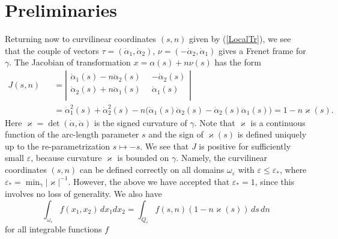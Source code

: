 \documentclass[graybox]{svmult}
\renewcommand{\kappa}{\varkappa}
\newcommand{\eps}{\varepsilon}
\renewcommand{\leq}{\leqslant}
\newcommand{\eqref}[1]{(\ref{#1})}
\begin{document}
\section{Preliminaries}


Returning now to curvilinear coordinates $(s,n)$ given by \eqref{LocalTr},
we see that the couple of vectors
$ \tau=(\dot{\alpha}_1, \dot{\alpha}_2)$, $\nu=(-\dot{\alpha}_2, \dot{\alpha}_1)$
gives a Frenet frame for $\gamma$.
The Jacobian of transformation $x=\alpha(s)+n\nu(s)$ has the form
\begin{eqnarray}\nonumber
J(s,n)&&=
\left|
        \begin{array}{cr}
          \dot{\alpha}_1(s)-n\ddot{\alpha}_2(s)\phantom{0} &  -\dot{\alpha}_2(s)\\
          \dot{\alpha}_2(s)+n\ddot{\alpha}_1(s)\phantom{0} & \dot{\alpha}_1(s)\\
        \end{array}
      \right|\\\nonumber
&&=\dot{\alpha}_1^2(s)+\dot{\alpha}_2^2(s)
-n\big(\dot{\alpha}_1(s)\ddot{\alpha}_2(s)-
  \dot{\alpha}_2(s)\ddot{\alpha}_1(s)\big)=1-n \kappa(s).
\end{eqnarray}
Here $\kappa=\det(\dot{\alpha},\ddot{\alpha})$ is the signed curvature of $\gamma$. Note that $\kappa$ is a continuous function
of the arc-length parameter $s$ and the sign of $\kappa(s)$ is defined uniquely up to the re-parametrization $s\mapsto-s$.
We see that $J$ is positive for sufficiently small $\eps$, because  curvature $\kappa$  is  bounded on $\gamma$.
Namely, the curvilinear coordinates $(s,n)$ can be defined correctly on all domains $\omega_\eps$ with $\eps\leq \eps_*$, where
$\eps_*=\min_{\gamma}|\kappa|^{-1}$.
However, the above we have accepted that $\eps_*=1$, since this
involves no loss of generality. We also have
$$
  \int_{\omega_\eps} f(x_1,x_2)\,dx_1dx_2=\int_{Q_\eps} f(s,n)(1-n\kappa(s))\,ds\,dn
$$
for all integrable functions $f$
\end{document}
